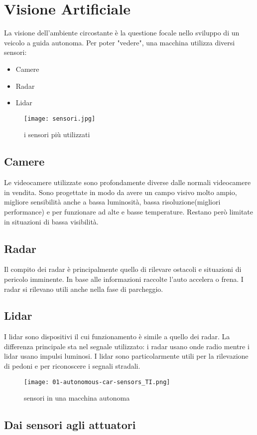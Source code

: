 \section{Visione Artificiale}
La visione dell'ambiente circostante è la questione focale nello sviluppo di un veicolo a guida autonoma. Per poter "vedere", una macchina utilizza diversi sensori:
\begin{itemize}
    \item  Camere
    \item Radar
    \item Lidar
\end{itemize}
\begin{figure}[h]
    \texttt{[image: sensori.jpg]}
    \caption{i sensori più utilizzati\cite{lid}}
    \label{fig:lid}
\end{figure}
\subsection{Camere}
Le videocamere utilizzate sono profondamente diverse dalle normali videocamere in vendita. Sono progettate in modo da avere un campo visivo molto ampio, migliore sensibilità anche a bassa luminosità,
bassa risoluzione(migliori performance) e per funzionare ad alte  e basse temperature. Restano però limitate in situazioni di bassa visibilità.     
\subsection{Radar}
Il compito dei radar è principalmente quello di rilevare ostacoli e situazioni di pericolo imminente. In base alle informazioni raccolte l'auto accelera o frena. 
I radar si rilevano utili anche nella fase di parcheggio.
\subsection{Lidar}
I lidar sono dispositivi il cui funzionamento è simile a quello dei radar. La differenza principale sta nel segnale utilizzato: i radar usano onde radio mentre i lidar usano impulsi luminosi.
I lidar sono particolarmente utili per la rilevazione di pedoni e per riconoscere i segnali stradali.
\begin{figure}[h!]
    \texttt{[image: 01-autonomous-car-sensors\_TI.png]}
    \caption{sensori in una macchina autonoma\cite{sensors}}
    \label{fig:sensors}
\end{figure}
\newpage
\subsection{Dai sensori agli attuatori}

